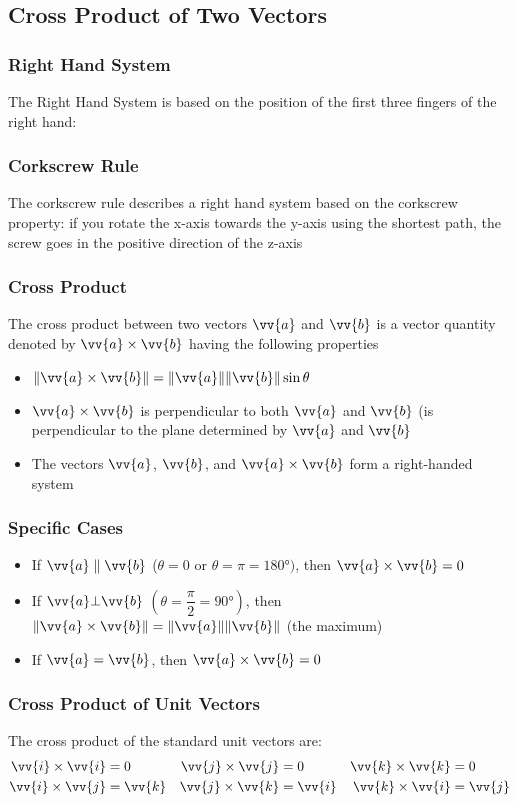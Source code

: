\documentclass{article}
\newcommand{\mv}[1]{
	\lVert\vv{#1}\rVert
}
\begin{document}
	\subsection{Cross Product of Two Vectors}
	\subsubsection{Right Hand System}
	The Right Hand System is based on the position of the first three fingers of the right hand: %
	\subsubsection{Corkscrew Rule}
	The corkscrew rule describes a right hand system based on the corkscrew property: if you rotate the x-axis towards the y-axis using the shortest path, the screw goes in the positive direction of the z-axis
	\subsubsection{Cross Product}
	The cross product between two vectors $\vv{a}$ and $\vv{b}$ is a vector quantity denoted by $\vv{a}\times\vv{b}$ having the following properties
	\begin{itemize}
		\item $\lVert\vv{a}\times\vv{b}\rVert=\mv{a}\mv{b}\sin\theta$
		\item $\vv{a}\times\vv{b}$ is perpendicular to both $\vv{a}$ and $\vv{b}$ (is perpendicular to the plane determined by $\vv{a}$ and $\vv{b}$
		\item The vectors $\vv{a}$, $\vv{b}$, and $\vv{a}\times\vv{b}$ form a right-handed system
	\end{itemize}
	\subsubsection{Specific Cases}
	\begin{itemize}
		\item If $\vv{a}\parallel\vv{b}$ ($\theta=0$ or $\theta=\pi=\ang{180})$, then $\vv{a}\times\vv{b}=0$
		\item If $\vv{a}\bot\vv{b}$ $\left(\theta=\dfrac{\pi}{2}=\ang{90}\right)$, then $\lVert\vv{a}\times\vv{b}\rVert=\mv{a}\mv{b}$ (the maximum)
		\item If $\vv{a}=\vv{b}$, then $\vv{a}\times\vv{b}=0$
	\end{itemize}
	\subsubsection{Cross Product of Unit Vectors}
	The cross product of the standard unit vectors are:
	\begin{align*}
		\vv{i}\times\vv{i}&=0&\vv{j}\times\vv{j}&=0&\vv{k}\times\vv{k}&=0\\
		\vv{i}\times\vv{j}&=\vv{k}&\vv{j}\times\vv{k}&=\vv{i}&\vv{k}\times\vv{i}&=\vv{j}
	\end{align*}
\end{document}
